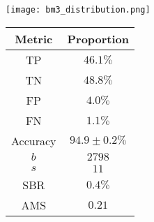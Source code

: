 \noindent\begin{minipage}{\textwidth}
\centering
  \begin{minipage}[htbp]{0.65\textwidth}
    \centering
    \texttt{[image: bm3\_distribution.png]}
    \label{fig:dist_bm3}
  \end{minipage}
  \hfill
  \begin{minipage}[htbp]{0.34\textwidth}
        \centering
        \begin{tabular}{c|c} 
        \toprule
        Metric & Proportion \\
        \midrule
        \rowcolor{gray!6} TP & $46.1 \%$ \\
        TN & $48.8 \%$ \\
        \rowcolor{gray!6} FP & $4.0 \%$\\
        FN & $1.1 \%$ \\
        \rowcolor{gray!6} Accuracy & $94.9 \pm 0.2 \%$ \\
        \midrule
        $b$ & $2798$ \\
        \rowcolor{gray!6} $s$ & $11$ \\
        SBR & $0.4\%$\\
        \rowcolor{gray!6} AMS & $0.21$ \\
        \bottomrule
        \end{tabular}
        \label{tab:Values3}
    \end{minipage}
\end{minipage}


